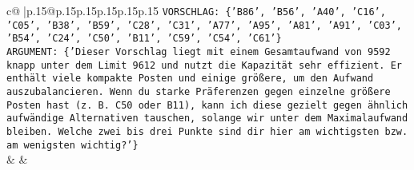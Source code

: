 \documentclass{article}
\begin{document}
{\begin{supertabular}{c@{$\;$}|p{.15\linewidth}@{}p{.15\linewidth}p{.15\linewidth}p{.15\linewidth}p{.15\linewidth}p{.15\linewidth}}
{{{\texttt{VORSCHLAG: \{'B86', 'B56', 'A40', 'C16', 'C05', 'B38', 'B59', 'C28', 'C31', 'A77', 'A95', 'A81', 'A91', 'C03', 'B54', 'C24', 'C50', 'B11', 'C59', 'C54', 'C61'\}} \\
\texttt{ARGUMENT: \{'Dieser Vorschlag liegt mit einem Gesamtaufwand von 9592 knapp unter dem Limit 9612 und nutzt die Kapazität sehr effizient. Er enthält viele kompakte Posten und einige größere, um den Aufwand auszubalancieren. Wenn du starke Präferenzen gegen einzelne größere Posten hast (z. B. C50 oder B11), kann ich diese gezielt gegen ähnlich aufwändige Alternativen tauschen, solange wir unter dem Maximalaufwand bleiben. Welche zwei bis drei Punkte sind dir hier am wichtigsten bzw. am wenigsten wichtig?'\}} \\
            }
        }
    }
    & & \\ \\


\end{supertabular}}
\end{document}
